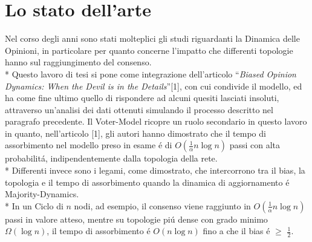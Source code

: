 \documentclass[../Tesi.tex]{subfiles}
\begin{document}
\section{Lo stato dell'arte}
Nel corso degli anni sono stati molteplici gli studi riguardanti la Dinamica delle Opinioni, in particolare per quanto concerne l'impatto che differenti topologie hanno sul raggiungimento del consenso.\\*
Questo lavoro di tesi si pone come integrazione dell'articolo ``\emph{Biased Opinion Dynamics: When the Devil is in the Details}''[1], con cui condivide il modello, ed ha come fine ultimo quello di rispondere ad alcuni quesiti lasciati insoluti, attraverso un'analisi dei dati ottenuti simulando il processo descritto nel paragrafo precedente.
Il Voter-Model ricopre un ruolo secondario in questo lavoro in quanto, nell'articolo [1], gli autori hanno dimostrato che il tempo di assorbimento nel modello preso in esame \'e di $O(\frac{1}{\alpha}n\log{}n)$ passi con alta probabilit\'a, indipendentemente dalla topologia della rete.\\*
Differenti invece sono i legami, come dimostrato, che intercorrono tra il bias, la topologia e il tempo di assorbimento quando la dinamica di aggiornamento \'e Majority-Dynamics.\\*
In un Ciclo di $n$ nodi, ad esempio, il consenso viene raggiunto in $O(\frac{1}{\alpha}n\log{}n)$ passi in valore atteso, mentre su topologie pi\'u dense con grado minimo $\Omega(\log{}n)$, il tempo di assorbimento \'e $O(n\log{}n)$ fino a che il bias \'e $\geq$ $\frac{1}{2}$.
\end{document}
